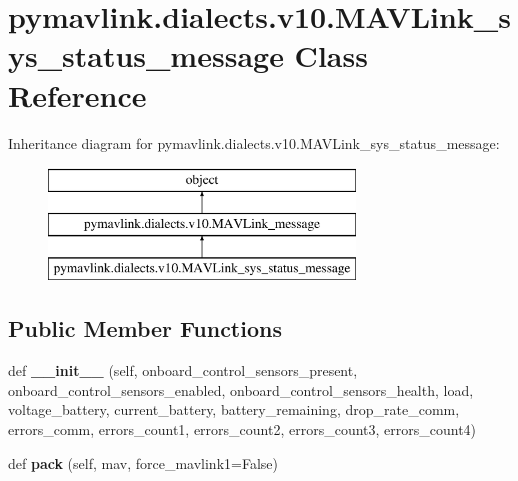 \hypertarget{classpymavlink_1_1dialects_1_1v10_1_1MAVLink__sys__status__message}{}\section{pymavlink.\+dialects.\+v10.\+M\+A\+V\+Link\+\_\+sys\+\_\+status\+\_\+message Class Reference}
\label{classpymavlink_1_1dialects_1_1v10_1_1MAVLink__sys__status__message}
Inheritance diagram for pymavlink.\+dialects.\+v10.\+M\+A\+V\+Link\+\_\+sys\+\_\+status\+\_\+message\+:\begin{figure}[H]
\begin{center}
\leavevmode
\includegraphics[height=3.000000cm]{classpymavlink_1_1dialects_1_1v10_1_1MAVLink__sys__status__message}
\end{center}
\end{figure}
\subsection*{Public Member Functions}
\begin{DoxyCompactItemize}
\item 
\mbox{\label{classpymavlink_1_1dialects_1_1v10_1_1MAVLink__sys__status__message_a8ff2fb85ef766241c4726791a018e3d3}} 
def {\bfseries \+\_\+\+\_\+init\+\_\+\+\_\+} (self, onboard\+\_\+control\+\_\+sensors\+\_\+present, onboard\+\_\+control\+\_\+sensors\+\_\+enabled, onboard\+\_\+control\+\_\+sensors\+\_\+health, load, voltage\+\_\+battery, current\+\_\+battery, battery\+\_\+remaining, drop\+\_\+rate\+\_\+comm, errors\+\_\+comm, errors\+\_\+count1, errors\+\_\+count2, errors\+\_\+count3, errors\+\_\+count4)
\item 
\mbox{\label{classpymavlink_1_1dialects_1_1v10_1_1MAVLink__sys__status__message_aeda0db6c92183a4f9ca7d688586d6a8d}} 
def {\bfseries pack} (self, mav, force\+\_\+mavlink1=False)
\end{DoxyCompactItemize}

